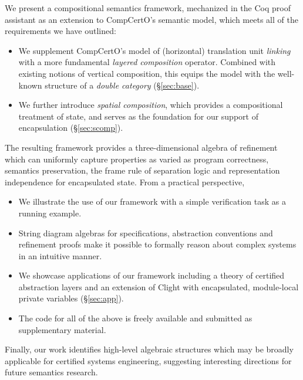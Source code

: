 \documentclass[acmsmall,screen,review,anonymous]{acmart}
\begin{document}
We present a compositional semantics framework,
mechanized in the Coq proof assistant
as an extension to CompCertO's semantic model,
which meets all of the requirements we have outlined:
\begin{itemize}
  \item We supplement CompCertO's model of (horizontal) translation unit \emph{linking}
    with a more fundamental \emph{layered composition} operator.
    Combined with existing notions of vertical composition,
    this equips the model with the well-known structure of a \emph{double category}
    (\S\ref{sec:base}).
  \item We further introduce \emph{spatial composition},
    which provides a compositional treatment of state,
    and serves as the foundation for our
    support of encapsulation (\S\ref{sec:scomp}).
\end{itemize}
The resulting framework provides a
three-dimensional algebra of refinement
which can uniformly capture properties as varied as
program correctness,
semantics preservation,
the frame rule of separation logic and
representation independence for encapsulated state.
From a practical perspective,
\begin{itemize}
  \item We illustrate the use of our framework
    with a simple verification task as a running example.
  \item String diagram algebras
    for specifications, abstraction conventions and refinement proofs
    make it possible to formally reason about complex systems
    in an intuitive manner.
  \item We showcase applications of our framework
    including a theory of certified abstraction layers
    and an extension of Clight with encapsulated,
    module-local private variables (\S\ref{sec:app}).
  \item The code for all of the above is freely available and
    submitted as supplementary material.
\end{itemize}
Finally,
our work identifies
high-level algebraic structures
which may be broadly applicable
for certified systems engineering,
suggesting interesting directions for
future semantics research.

\end{document}
